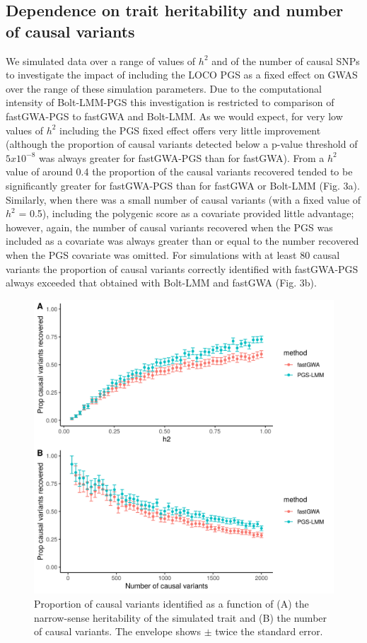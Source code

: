 \documentclass[fleqn,10pt]{wlscirep}
\begin{document}
\subsection*{Dependence on trait heritability and number of causal variants}
We simulated data over a range of values of $h^2$ and of the number of causal SNPs to investigate the impact of including the LOCO PGS as a fixed effect on GWAS over the range of these simulation parameters. Due to the computational intensity of Bolt-LMM-PGS this investigation is restricted to comparison of fastGWA-PGS to fastGWA and Bolt-LMM. As we would expect, for very low values of $h^2$ including the PGS fixed effect offers very little improvement (although the proportion of causal variants detected below a p-value threshold of $5x10^{-8}$ was always greater for fastGWA-PGS than for fastGWA). From a $h^2$ value of around 0.4 the proportion of the causal variants recovered tended to be significantly greater for fastGWA-PGS than for fastGWA or Bolt-LMM (Fig. 3a). Similarly, when there was a small number of causal variants (with a fixed value of $h^2$ = 0.5), including the polygenic score as a covariate provided little advantage; however, again, the number of causal variants recovered when the PGS was included as a covariate was always greater than or equal to the number recovered when the PGS covariate was omitted. For simulations with at least 80 causal variants the proportion of causal variants correctly identified with fastGWA-PGS always exceeded that obtained with Bolt-LMM and fastGWA (Fig. 3b). \par

\begin{figure}
\centering
\includegraphics[width=150mm]{images/Fig3}
\caption{Proportion of causal variants identified as a function of (A) the narrow-sense heritability of the simulated trait and (B) the number of causal variants. The envelope shows $\pm$ twice the standard error.}
\label{fig:Recovery of causal variants varying parameters}
\end{figure}
\end{document}
